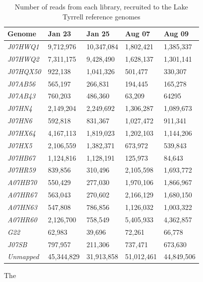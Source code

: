 \begin{table}[ht]
  \caption{Number of reads from each library, recruited to the Lake Tyrrell reference genomes}
  \begin{tabularx}{\textwidth}{L{2.2cm}R{2cm}R{3cm}R{3.2cm}R{2cm}}
  \hline
    \textbf{Genome} & \textbf{Jan 23} & \textbf{Jan 25} & \textbf{Aug 07} & \textbf{Aug 09} \\
    \hline
     \textit{J07HWQ1} & 9,712,976 & 10,347,084 & 1,802,421 & 1,385,337 \\
     \textit{J07HWQ2} & 7,311,175 & 9,428,490 & 1,628,137 & 1,301,141 \\
     \textit{J07HQX50} & 922,138 & 1,041,326 & 501,477 & 330,307 \\
     \textit{J07AB56} & 565,197 & 266,831 & 194,445 & 165,278 \\
     \textit{J07AB43} & 760,203 & 486,360 & 63,209 & 64295 \\
     \textit{J07HN4} & 2,149,204 & 2,249,692 & 1,306,287 & 1,089,673 \\
     \textit{J07HN6} & 592,818 & 831,367 & 1,027,472 & 911,341 \\
     \textit{J07HX64} & 4,167,113 & 1,819,023 & 1,202,103 & 1,144,206 \\
     \textit{J07HX5} & 2,106,559 & 1,382,371 & 673,972 & 539,843 \\
     \textit{J07HB67} & 1,124,816 & 1,128,191 & 125,973 & 84,643 \\
     \textit{J07HR59} & 839,856 & 310,496 & 2,105,598 & 1,693,772 \\
     \textit{A07HB70} & 550,429 & 277,030 & 1,970,106 & 1,866,967 \\
     \textit{A07HR67} & 563,043 & 270,602 & 2,166,129 & 1,680,150 \\
     \textit{A07HN63} & 547,808 & 786,856 & 1,126,032 & 1,003,322 \\
     \textit{A07HR60} & 2,126,700 & 758,549 & 5,405,933 & 4,362,857 \\
     \textit{G22} & 62,983 & 39,696 & 72,261 & 66,778 \\
     \textit{J07SB} & 797,957 & 211,306 & 737,471 & 673,630 \\     
  \textit{Unmapped} & 45,344,829 & 31,913,858 & 51,012,461 & 44,849,506 \\
  \end{tabularx}
  \label{ReadRecruitmentGenome}
\end{table}

The 




